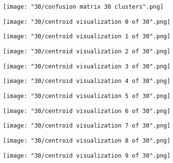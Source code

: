 \documentclass{article}
\begin{document}
\begin{figure}[h!]
    \noindent\texttt{[image: "30/confusion matrix 30 clusters".png]}
\end{figure}

\begin{figure}[h!]
    \noindent\texttt{[image: "30/centroid visualization 0 of 30".png]}
\end{figure}

\begin{figure}[h!]
    \noindent\texttt{[image: "30/centroid visualization 1 of 30".png]}
\end{figure}

\begin{figure}[h!]
    \noindent\texttt{[image: "30/centroid visualization 2 of 30".png]}
\end{figure}

\begin{figure}[h!]
    \noindent\texttt{[image: "30/centroid visualization 3 of 30".png]}
\end{figure}

\begin{figure}[h!]
    \noindent\texttt{[image: "30/centroid visualization 4 of 30".png]}
\end{figure}

\begin{figure}[h!]
    \noindent\texttt{[image: "30/centroid visualization 5 of 30".png]}
\end{figure}

\begin{figure}[h!]
    \noindent\texttt{[image: "30/centroid visualization 6 of 30".png]}
\end{figure}

\begin{figure}[h!]
    \noindent\texttt{[image: "30/centroid visualization 7 of 30".png]}
\end{figure}

\begin{figure}[h!]
    \noindent\texttt{[image: "30/centroid visualization 8 of 30".png]}
\end{figure}

\begin{figure}[h!]
    \noindent\texttt{[image: "30/centroid visualization 9 of 30".png]}
\end{figure}
\end{document}
